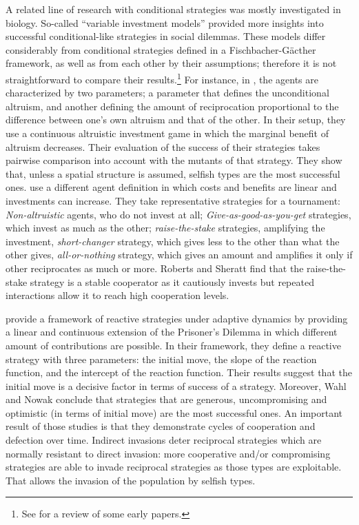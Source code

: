 \documentclass[12pt]{article}
\begin{document}
A related line of research with conditional strategies was mostly investigated in biology. So-called ``variable investment models'' provided more insights into successful conditional-like strategies in social dilemmas. These models differ considerably from conditional strategies defined in a Fischbacher-G{\"a}cther framework, as well as from each other by their assumptions; therefore it is not straightforward to compare their results.\footnote{See \citet{Sherratt2002-lx} for a review of some early papers.} For instance,  in \citet{Doebeli1998-cw}, the agents are characterized by two parameters; a parameter that defines the unconditional altruism, and another defining the amount of reciprocation proportional to the difference between one's own altruism and that of the other. In their setup, they use a continuous altruistic investment game in which the marginal benefit of altruism  decreases.  Their evaluation of the success of their strategies takes pairwise comparison into account with the mutants of that strategy. They show that, unless a spatial structure is assumed, selfish types are the most successful ones. \citet{Roberts1998-es} use a different agent definition in which costs and benefits are linear and investments can increase. They take representative strategies for a tournament: \textit{Non-altruistic} agents, who do not invest at all; \textit{Give-as-good-as-you-get} strategies, which invest as much as the other; \textit{raise-the-stake} strategies, amplifying the investment, \textit{short-changer} strategy, which gives less to the other than what the other gives, \textit{all-or-nothing} strategy, which gives an amount and amplifies it only if other reciprocates as much or more. Roberts and Sheratt find that the raise-the-stake strategy is a stable cooperator as it cautiously invests but repeated interactions allow it to reach high cooperation levels.

\citet{Wahl1999-zi,Wahl1999-nn} provide a framework of reactive strategies under adaptive dynamics by providing a linear and continuous extension of the Prisoner's Dilemma in which different amount of contributions are possible. In their framework, they define a reactive strategy with three parameters: the initial move, the slope of the reaction function, and the intercept of the reaction function. Their results suggest that the initial move is a decisive factor in terms of success of a strategy. Moreover, Wahl and Nowak conclude that strategies that are generous, uncompromising and optimistic (in terms of initial move) are the most successful ones. An important result of those studies is  that they demonstrate cycles of cooperation and defection over time. Indirect invasions deter reciprocal strategies which are normally resistant to direct invasion: more cooperative and/or compromising strategies are able to invade reciprocal strategies as those types are exploitable. That allows the invasion of the population by selfish types. 
\end{document}
